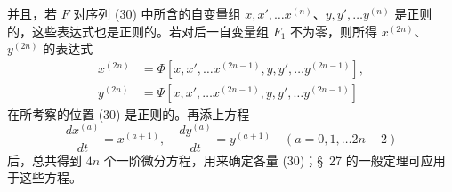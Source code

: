 \documentclass[11pt,a4paper,leqno]{article}
\begin{document}
并且，若 $F$ 对序列 (30) 中所含的自变量组 $x,x',\ldots x^{(n)}$、$y,y',\ldots y^{(n)}$ 是正则的，这些表达式也是正则的。若对后一自变量组 $F_1$ 不为零，则所得 $x^{(2n)}$、$y^{(2n)}$ 的表达式
\begin{equation}\tag{31}
\begin{aligned}
x^{(2n)}&=\Phi[x,x',\ldots x^{(2n-1)},y,y',\ldots y^{(2n-1)}],\\
y^{(2n)}&=\Psi[x,x',\ldots x^{(2n-1)},y,y',\ldots y^{(2n-1)}]
\end{aligned}
\end{equation}
在所考察的位置 (30) 是正则的。再添上方程
\begin{equation}\tag{32}
\frac{dx^{(a)}}{dt}=x^{(a+1)},\quad
\frac{dy^{(a)}}{dt}=y^{(a+1)}\quad (a=0,1,\ldots 2n-2)
\end{equation}
后，总共得到 $4n$ 个一阶微分方程，用来确定各量 (30)；\S~27 的一般定理可应用于这些方程。
\end{document}
